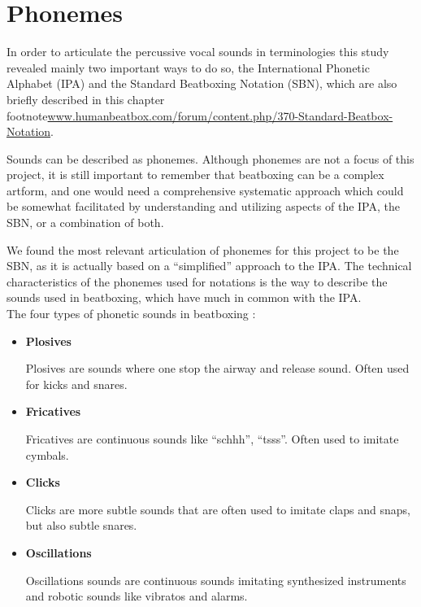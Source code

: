 \section{Phonemes}
\label{SBN}
In order to articulate the percussive vocal sounds in terminologies this study revealed mainly two important ways to do so, the International Phonetic Alphabet (IPA) \citep{ipa} and the Standard Beatboxing Notation (SBN), which are also briefly described in this chapter \\footnote{\url{www.humanbeatbox.com/forum/content.php/370-Standard-Beatbox-Notation}}.


Sounds can be described as phonemes. Although phonemes are not a focus of this project, it is still important to remember that beatboxing can be a complex artform, and one would need a comprehensive systematic approach which could be somewhat facilitated by understanding and utilizing aspects of the IPA, the SBN, or a combination of both.


We found the most relevant articulation of phonemes for this project to be the SBN, as it is actually based on a “simplified” approach to the IPA. The technical characteristics of the phonemes used for notations is the way to describe the sounds used in beatboxing, which have much in common with the IPA. \\


The four types of phonetic sounds in beatboxing \citep{BeatboxBible}:

  \begin{itemize} 
	\item\textbf{Plosives}

	
	Plosives are sounds where one stop the airway and release sound. Often used for kicks and snares.
  
	\item\textbf{Fricatives}
	
	
	{Fricatives are continuous sounds like “schhh”, “tsss”. Often used to imitate cymbals.}
	
	\item\textbf{Clicks}
	
	
	{Clicks are more subtle sounds that are often used to imitate claps and snaps, but also subtle snares.}
	
	\item\textbf{Oscillations}
	
	{Oscillations sounds are continuous sounds imitating synthesized instruments and robotic sounds like vibratos and alarms.}
\end{itemize}

